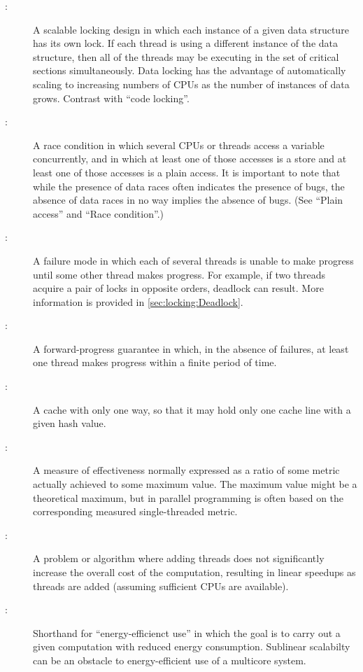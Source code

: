 \begin{description}
\item[:]
	A scalable locking design in which each instance of a given
	data structure has its own lock.
	If each thread is using a different instance of the
	data structure, then all of the threads may be executing in
	the set of critical sections simultaneously.
	Data locking has the advantage of automatically scaling to
	increasing numbers of CPUs as the number of instances of
	data grows.
	Contrast with ``code locking''.
\item[:]
	A race condition in which several CPUs or threads access
	a variable concurrently, and in which at least one of those
	accesses is a store and at least one of those accesses
	is a plain access.
	It is important to note that while the presence of data races
	often indicates the presence of bugs, the absence of data races
	in no way implies the absence of bugs.
	(See ``Plain access'' and ``Race condition''.)
\item[:]
	A failure mode in which each of several threads is unable to
	make progress until some other thread makes progress.
	For example, if two threads acquire a pair of locks in opposite
	orders, deadlock can result.
	More information is provided in
	\cref{sec:locking:Deadlock}.
\item[:]
	A forward-progress guarantee in which, in the absence of
	failures, at least one thread makes progress within a finite
	period of time.
\item[:]
	A cache with only one way, so that it may hold only one cache
	line with a given hash value.
\item[:]
	A measure of effectiveness normally expressed as a ratio
	of some metric actually achieved to some maximum value.
	The maximum value might be a theoretical maximum, but in
	parallel programming is often based on the corresponding
	measured single-threaded metric.
\item[:]
	A problem or algorithm where adding threads does not significantly
	increase the overall cost of the computation, resulting in
	linear speedups as threads are added (assuming sufficient
	CPUs are available).
\item[:]
	Shorthand for ``energy-efficienct use'' in which the goal is to
	carry out a given computation with reduced energy consumption.
	Sublinear scalabilty can be an obstacle to energy-efficient use
	of a multicore system.

\end{description}
